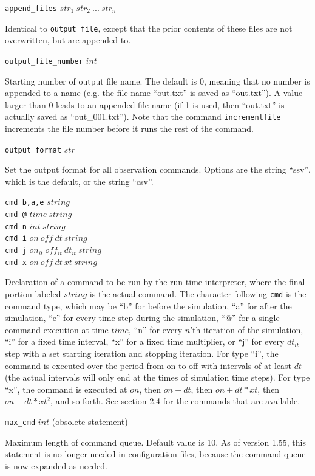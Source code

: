 \documentclass {book}
\newcommand {\ttt} {\texttt}
\begin{document}
\begin{description}
\item{\ttt{append\_files} $str_1\ str_2\ ...\ str_n$}

Identical to \ttt{output\_file}, except that the prior contents of these files are not overwritten, but are appended to.

\item{\ttt{output\_file\_number} $int$}

Starting number of output file name. The default is 0, meaning that no number is appended to a name (e.g. the file name ``out.txt'' is saved as ``out.txt''). A value larger than 0 leads to an appended file name (if 1 is used, then ``out.txt'' is actually saved as ``out\_001.txt''). Note that the command \ttt{incrementfile} increments the file number before it runs the rest of the command.

\item{\ttt{output\_format} $str$}

Set the output format for all observation commands. Options are the string ``ssv'', which is the default, or the string ``csv''.

\item{\ttt{cmd b,a,e} $string$\\
\ttt{cmd @} $time\ string$\\
\ttt{cmd n} $int\ string$\\
\ttt{cmd i} $on\ off\ dt\ string$\\
\ttt{cmd j} $on_{it}\ off_{it}\ dt_{it}\ string$\\
\ttt{cmd x} $on\ off\ dt\ xt\ string$}

Declaration of a command to be run by the run-time interpreter, where the final portion labeled $string$ is the actual command. The character following \ttt{cmd} is the command type, which may be ``b'' for before the simulation, ``a'' for after the simulation, ``e'' for every time step during the simulation, ``@'' for a single command execution at time $time$, ``n'' for every $n$'th iteration of the simulation, ``i'' for a fixed time interval, ``x'' for a fixed time multiplier, or ``j'' for every $dt_{it}$ step with a set starting iteration and stopping iteration. For type ``i'', the command is executed over the period from on to off with intervals of at least $dt$ (the actual intervals will only end at the times of simulation time steps). For type ``x'', the command is executed at $on$, then $on+dt$, then $on+dt*xt$, then $on+dt*xt^2$, and so forth. See section 2.4 for the commands that are available.

\item{\ttt{max\_cmd} $int$ (obsolete statement)}

Maximum length of command queue. Default value is 10. As of version 1.55, this statement is no longer needed in configuration files, because the command queue is now expanded as needed.

\end{description}
\end{document}
